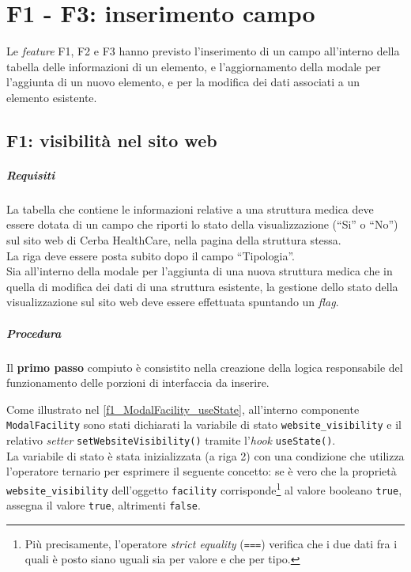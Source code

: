 \newpage\section{F1 - F3: inserimento campo}
\label{sec:F1 - F3: inserimento campo}
Le \textit{feature} F1, F2 e F3 hanno previsto l'inserimento di un campo all'interno della tabella delle informazioni di un elemento, e l'aggiornamento della modale per l'aggiunta di un nuovo elemento, e per la modifica dei dati associati a un elemento esistente.

\subsection{F1: visibilità nel sito web}
\label{subsec:F1: visibilità nel sito web}
\subparagraph{Requisiti}
La tabella che contiene le informazioni relative a una struttura medica deve essere dotata di un campo che riporti lo stato della visualizzazione (“Si” o “No”) sul sito web di Cerba HealthCare, nella pagina della struttura stessa.\\
La riga deve essere posta subito dopo il campo “Tipologia”.\\ 
Sia all'interno della modale per l'aggiunta di una nuova struttura medica che in quella di modifica dei dati di una struttura esistente, la gestione dello stato della visualizzazione sul sito web deve essere effettuata spuntando un \textit{flag}.

\subparagraph{Procedura}
Il \textbf{primo passo} compiuto è consistito nella creazione della logica responsabile del funzionamento delle porzioni di interfaccia da inserire.

Come illustrato nel \autoref{f1_ModalFacility_useState}, all'interno componente \texttt{ModalFacility} sono stati dichiarati la variabile di stato \texttt{website\_visibility} e il relativo \textit{setter} \texttt{setWebsiteVisibility()} tramite l'\textit{hook} \texttt{useState()}.\\
La variabile di stato è stata inizializzata (a riga 2) con una condizione che utilizza l'operatore ternario per esprimere il seguente concetto: se è vero che la proprietà \texttt{website\_visibility} dell'oggetto \texttt{facility} corrisponde\footnote{Più precisamente, l'operatore \textit{strict equality} (\texttt{===}) verifica che i due dati fra i quali è posto siano uguali sia per valore e che per tipo.} al valore booleano \texttt{true}, assegna il valore \texttt{true}, altrimenti \texttt{false}.

